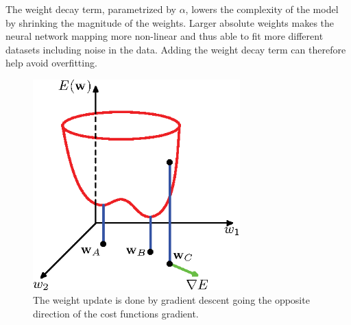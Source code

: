 \documentclass[12pt]{article}
\begin{document}
The weight decay term, parametrized by $\alpha$, lowers the complexity of the model by shrinking the magnitude of the weights. Larger absolute weights makes the neural network mapping more non-linear and thus able to fit more different datasets including noise in the data. Adding the weight decay term can therefore help avoid overfitting.
%
\begin{figure}[ht]
\center
\includegraphics[width=8cm]{Bishop_figure5d5.eps}
\caption{The weight update is done by gradient descent going the
opposite direction of the cost functions gradient.}
\label{gradient.eps}
\end{figure}
%
\end{document}
